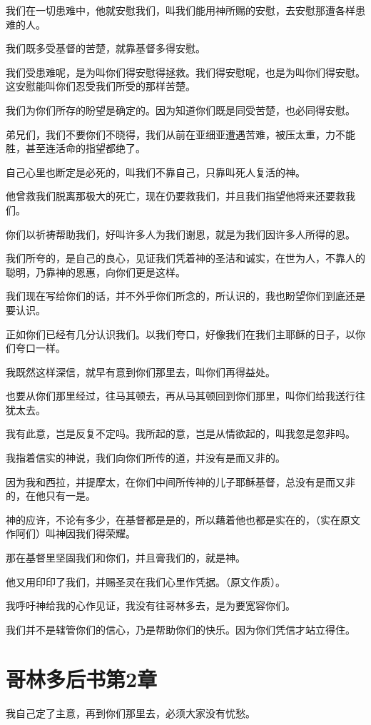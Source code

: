 \documentclass[12pt,oneside]{book}
\begin{document}
我们在一切患难中，他就安慰我们，叫我们能用神所赐的安慰，去安慰那遭各样患难的人。

我们既多受基督的苦楚，就靠基督多得安慰。

我们受患难呢，是为叫你们得安慰得拯救。我们得安慰呢，也是为叫你们得安慰。这安慰能叫你们忍受我们所受的那样苦楚。

我们为你们所存的盼望是确定的。因为知道你们既是同受苦楚，也必同得安慰。

弟兄们，我们不要你们不晓得，我们从前在亚细亚遭遇苦难，被压太重，力不能胜，甚至连活命的指望都绝了。

自己心里也断定是必死的，叫我们不靠自己，只靠叫死人复活的神。

他曾救我们脱离那极大的死亡，现在仍要救我们，并且我们指望他将来还要救我们。

你们以祈祷帮助我们，好叫许多人为我们谢恩，就是为我们因许多人所得的恩。

我们所夸的，是自己的良心，见证我们凭着神的圣洁和诚实，在世为人，不靠人的聪明，乃靠神的恩惠，向你们更是这样。

我们现在写给你们的话，并不外乎你们所念的，所认识的，我也盼望你们到底还是要认识。

正如你们已经有几分认识我们。以我们夸口，好像我们在我们主耶稣的日子，以你们夸口一样。

我既然这样深信，就早有意到你们那里去，叫你们再得益处。

也要从你们那里经过，往马其顿去，再从马其顿回到你们那里，叫你们给我送行往犹太去。

我有此意，岂是反复不定吗。我所起的意，岂是从情欲起的，叫我忽是忽非吗。

我指着信实的神说，我们向你们所传的道，并没有是而又非的。

因为我和西拉，并提摩太，在你们中间所传神的儿子耶稣基督，总没有是而又非的，在他只有一是。

神的应许，不论有多少，在基督都是是的，所以藉着他也都是实在的，（实在原文作阿们）叫神因我们得荣耀。

那在基督里坚固我们和你们，并且膏我们的，就是神。

他又用印印了我们，并赐圣灵在我们心里作凭据。（原文作质）。

我呼吁神给我的心作见证，我没有往哥林多去，是为要宽容你们。

我们并不是辖管你们的信心，乃是帮助你们的快乐。因为你们凭信才站立得住。

\chapter{哥林多后书第2章}
我自己定了主意，再到你们那里去，必须大家没有忧愁。
\end{document}
